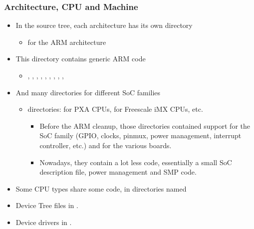 \begin{frame}
  \frametitle{Architecture, CPU and Machine}
  \begin{itemize}
  \item In the source tree, each architecture has its own directory
    \begin{itemize}
    \item {} for the ARM architecture
    \end{itemize}
  \item This directory contains generic ARM code
    \begin{itemize}
    \item {}, , , ,
      , , , ,
      , 
    \end{itemize}
  \item And many directories for different SoC families
    \begin{itemize}
    \item {} directories:  for PXA CPUs,
       for Freescale iMX CPUs, etc.
      \begin{itemize}
      \item Before the ARM cleanup, those directories contained
        support for the SoC family (GPIO, clocks, pinmux, power
        management, interrupt controller, etc.) and for the various
        boards.
      \item Nowadays, they contain a lot less code, essentially a
        small SoC description file, power management and SMP code.
      \end{itemize}
    \end{itemize}
  \item Some CPU types share some code, in directories named
  \item Device Tree files in .
  \item Device drivers in .
  \end{itemize}
\end{frame}

